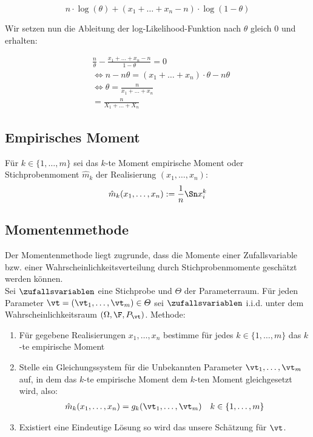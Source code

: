 $$n \cdot \log (\theta) +  (x_1 + \ldots + x_n - n) \cdot \log (1 - \theta)$$

Wir setzen nun die Ableitung der log-Likelihood-Funktion nach $\theta$ gleich
$0$ und erhalten:

\begin{align*}
   & \frac{n}{\theta} - \frac{x_1 + \ldots + x_n - n}{1 - \theta} = 0               \\
   & \Longleftrightarrow n - n\theta =  (x_1 + \ldots + x_n) \cdot \theta - n\theta \\
   & \Longleftrightarrow \theta = \frac{n}{x_1 + \ldots + x_n}                      \\
   & = \frac{n}{X_1 + \ldots + X_n}
\end{align*}

\BoxEnd{}
\subsection*{Empirisches Moment}
Für $k \in \{1, \dots, m\}$ sei das $k$-te Moment empirische Moment oder
Stichprobenmoment $\hat{m}_k$ der Realisierung $ (x_1, \dots, x_n)$:
\begin{align*}
  \hat{m}_k (x_1, \dots, x_n) := \frac{1}{n} \Sn x_i^k
\end{align*}
\subsection*{Momentenmethode}
Der Momentenmethode liegt zugrunde, dass die Momente einer Zufallsvariable bzw.
einer Wahrscheinlichkeitsverteilung durch Stichprobenmomente geschätzt werden
können.\\ Sei $\zufallsvariablen$ eine Stichprobe und $\varTheta$ der
Parameterraum. Für jeden Parameter $\vt = (\vt_1, \dots, \vt_m) \in \varTheta$
sei $\zufallsvariablen$ i.i.d. unter dem Wahrscheinlichkeitsraum $ (\Omega, \F,
  P_\vt)$. Methode:
\begin{enumerate}
  \item Für gegebene Realisierungen $x_1, \dots, x_n$ bestimme für jedes $k \in \{1,
          \dots, m\}$ das $k$-te empirische Moment
  \item Stelle ein Gleichungssystem für die Unbekannten Parameter $\vt_1, \dots, \vt_m$
        auf, in dem das $k$-te empirische Moment dem $k$-ten Moment gleichgesetzt wird,
        also:
        \begin{align*}
          \hat{m}_k (x_1, \dots, x_n) = g_k (\vt_1, \dots, \vt_m)
           &  & k \in \{1, \dots, m\}
        \end{align*}
  \item Existiert eine Eindeutige Lösung so wird das unsere Schätzung für $\vt$.
\end{enumerate}
